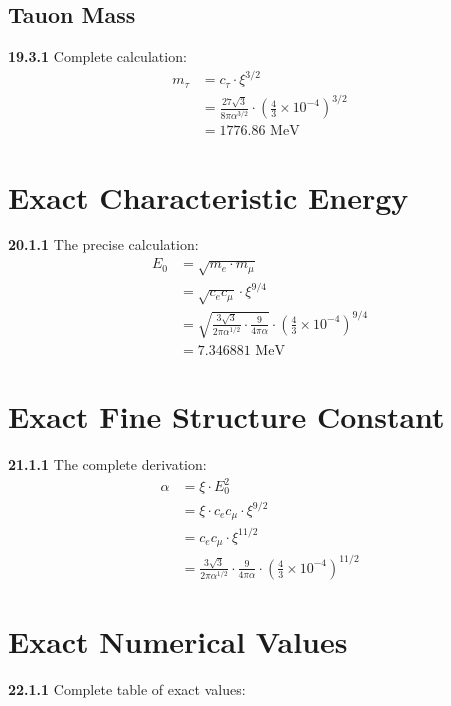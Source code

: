 \documentclass[12pt,a4paper]{article}
\begin{document}
\subsection{Tauon Mass}
\noindent \textbf{19.3.1} Complete calculation:
\begin{align}
	m_\tau &= c_\tau \cdot \xi^{3/2} \\
	&= \frac{27\sqrt{3}}{8\pi\alpha^{3/2}} \cdot \left(\frac{4}{3} \times 10^{-4}\right)^{3/2} \\
	&= 1776.86 \text{ MeV}
\end{align}

\section{Exact Characteristic Energy}
\noindent \textbf{20.1.1} The precise calculation:
\begin{align}
	E_0 &= \sqrt{m_e \cdot m_\mu} \\
	&= \sqrt{c_e c_\mu} \cdot \xi^{9/4} \\
	&= \sqrt{\frac{3\sqrt{3}}{2\pi\alpha^{1/2}} \cdot \frac{9}{4\pi\alpha}} \cdot \left(\frac{4}{3} \times 10^{-4}\right)^{9/4} \\
	&= 7.346881 \text{ MeV}
\end{align}

\section{Exact Fine Structure Constant}
\noindent \textbf{21.1.1} The complete derivation:
\begin{align}
	\alpha &= \xi \cdot E_0^2 \\
	&= \xi \cdot c_e c_\mu \cdot \xi^{9/2} \\
	&= c_e c_\mu \cdot \xi^{11/2} \\
	&= \frac{3\sqrt{3}}{2\pi\alpha^{1/2}} \cdot \frac{9}{4\pi\alpha} \cdot \left(\frac{4}{3} \times 10^{-4}\right)^{11/2}
\end{align}

\section{Exact Numerical Values}

\noindent \textbf{22.1.1} Complete table of exact values:
\end{document}
